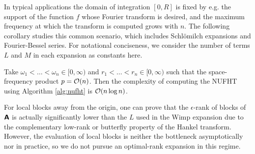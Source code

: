 In typical applications the domain of integration $[0,R]$ is fixed by e.g. the
support of the function $f$ whose Fourier transform is desired, and the maximum
frequency at which the transform is computed grows with $n$. The following
corollary studies this common scenario, which includes Schl\"omilch expansions
and Fourier-Bessel series. For notational conciseness, we consider the number of
terms $L$ and $M$ in each expansion as constants here.
\begin{corollary} \label{cor:complexity} Take $\omega_1 < \dots < \omega_n \in
    [0,\infty)$ and $r_1 < \dots < r_n \in [0,\infty)$ such that the
    space-frequency product $p = \mathcal{O}(n)$. Then the complexity of computing the
    NUFHT using Algorithm \ref{alg:nufht} is $\mathcal{O}(n\log n)$.
\end{corollary}

\begin{remark}
    For local blocks away from the origin, one can prove that the
    $\epsilon$-rank of blocks of $\bm{\mathsf{A}}$ is actually significantly lower than
    the $L$ used in the Wimp expansion due to the complementary low-rank or
    butterfly property of the Hankel transform. However, the evaluation of local
    blocks is neither the bottleneck asymptotically nor in practice, so we do
    not pursue an optimal-rank expansion in this regime.
\end{remark}